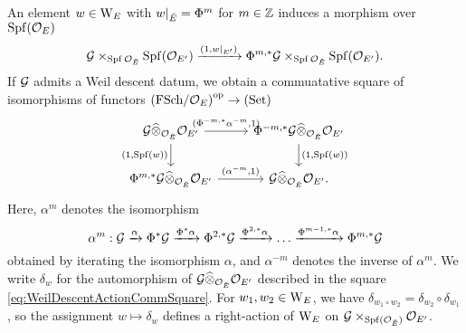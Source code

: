 \documentclass[../main.tex]{subfiles}
\begin{document}
An element $w \in \mathrm W_E$ with $w|_{{\breve {E}}} = \Phi^m$ for $m \in \mathbb{Z}$ induces
a morphism over $\operatorname{Spf}(\mathcal{O}_E)$
\begin{equation*}
  \mathcal{G} \times_{\operatorname{Spf}{\mathcal{O}_{{\breve {E}}}}} \operatorname{Spf}(\mathcal{O}_{{E'}}) \xrightarrow{(1,w|_{E'})}
  \Phi^{m, *}\mathcal{G} \times_{\operatorname{Spf}{\mathcal{O}_{{\breve {E}}}}} \operatorname{Spf}(\mathcal{O}_{{E'}}).
\end{equation*}
If $\mathcal{G}$ admits a Weil descent datum, we obtain a commuatative square 
of isomorphisms of functors ${(\mathrm{FSch}/{\mathcal{O}_E})}^{{\mathrm{op}}} \to {(\mathrm{Set})}$ 
\begin{equation}\label{eq:WeilDescentActionCommSquare}
\begin{tikzcd}[ampersand replacement=\&]
	{\cG \cotimes_{\cO_\br E} \cO_{{E'}}} \& {\Phi^{-m, *}\cG \cotimes_{\cO_\br E} \cO_{E'}} \\
	{\Phi^{m, *}\cG \cotimes_{\cO_\br E} \cO_{{E'}}} \& {\cG \cotimes_{\cO_\br E} \cO_{E'}}.
	\arrow["{(\Phi^{-m, *} \alpha^{-m}, 1)}", from=1-1, to=1-2]
	\arrow["{(1, \spf(w))}"', from=1-1, to=2-1]
	\arrow["{(1,\spf(w))}", from=1-2, to=2-2]
	\arrow["{(\alpha^{-m}, 1)}", from=2-1, to=2-2]
\end{tikzcd}
\end{equation}
Here, $\alpha^{m}$ denotes the isomorphism 
$$\alpha^m: \mathcal{G} \xrightarrow{\alpha} \Phi^{*} \mathcal{G} \xrightarrow{\Phi^* \alpha} \Phi^{2, *}\mathcal{G}
\xrightarrow{\Phi^{2,*}\alpha} \dots \xrightarrow{\Phi^{m-1,*}\alpha} \Phi^{m,*}\mathcal{G}$$ 
obtained by iterating the isomorphism $\alpha$, and 
$\alpha^{-m}$ denotes the inverse of $\alpha^{m}$. 
We write $\delta_w$ for the automorphism of $\mathcal{G} \widehat \otimes_{\mathcal{O}_{\breve {E}}} \mathcal{O}_{{E'}}$
described in the square \eqref{eq:WeilDescentActionCommSquare}.
For $w_1, w_2 \in \mathrm W_E$, we have $\delta_{w_1 \circ w_2} = \delta_{w_2}
\circ \delta_{w_1}$,
so the assignment $w \mapsto \delta_{w}$ defines a right-action of 
$\mathrm W_E$ on $\mathcal{G} \times_{\operatorname{Spf}(\mathcal{O}_{{\breve {E}}})} \mathcal{O}_{{E'}}$. 
\end{document}
